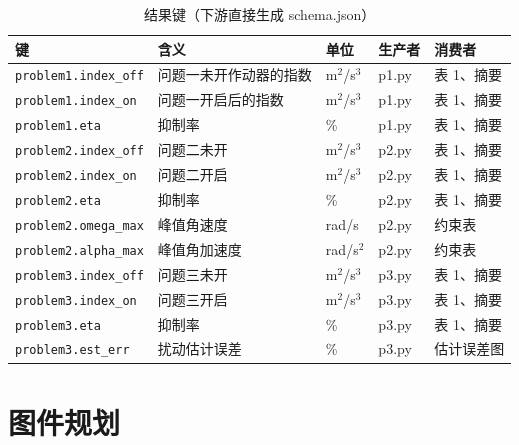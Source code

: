 \documentclass[a4paper,11pt]{ctexart}
\begin{document}
\begin{table}[htbp]\centering\small
  \caption{结果键（下游直接生成 schema.json）}
  \begin{tabular}{@{}L{0.30\textwidth}L{0.26\textwidth}C{0.10\textwidth}L{0.12\textwidth}L{0.12\textwidth}@{}}
    \toprule
    键 & 含义 & 单位 & 生产者 & 消费者 \\
    \midrule
    \texttt{problem1.index\_off} & 问题一未开作动器的指数 & m$^2$/s$^3$ & p1.py & 表 1、摘要 \\
    \texttt{problem1.index\_on}  & 问题一开启后的指数 & m$^2$/s$^3$ & p1.py & 表 1、摘要 \\
    \texttt{problem1.eta}        & 抑制率 & \% & p1.py & 表 1、摘要 \\
    \texttt{problem2.index\_off} & 问题二未开 & m$^2$/s$^3$ & p2.py & 表 1、摘要 \\
    \texttt{problem2.index\_on}  & 问题二开启 & m$^2$/s$^3$ & p2.py & 表 1、摘要 \\
    \texttt{problem2.eta}        & 抑制率 & \% & p2.py & 表 1、摘要 \\
    \texttt{problem2.omega\_max} & 峰值角速度 & rad/s & p2.py & 约束表 \\
    \texttt{problem2.alpha\_max} & 峰值角加速度 & rad/s$^2$ & p2.py & 约束表 \\
    \texttt{problem3.index\_off} & 问题三未开 & m$^2$/s$^3$ & p3.py & 表 1、摘要 \\
    \texttt{problem3.index\_on}  & 问题三开启 & m$^2$/s$^3$ & p3.py & 表 1、摘要 \\
    \texttt{problem3.eta}        & 抑制率 & \% & p3.py & 表 1、摘要 \\
    \texttt{problem3.est\_err}   & 扰动估计误差 & \% & p3.py & 估计误差图 \\
    \bottomrule
  \end{tabular}
\end{table}

\section{图件规划}
\end{document}
